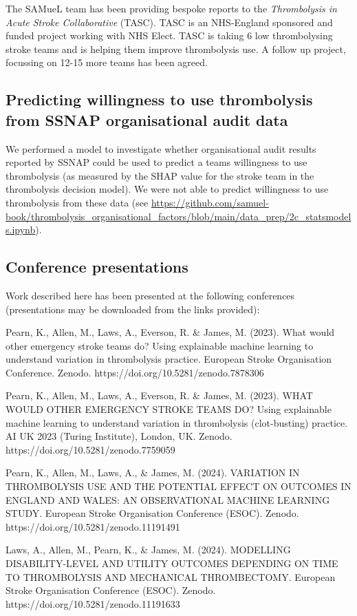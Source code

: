 The SAMueL team has been providing bespoke reports to the \textit{Thrombolysis in Acute Stroke Collaborative} (TASC). TASC is an NHS-England sponsored and funded project working with NHS Elect. TASC is taking 6 low thrombolysing stroke teams and is helping them improve thrombolysis use. A follow up project, focussing on 12-15 more teams has been agreed.

\subsection{Predicting willingness to use thrombolysis from SSNAP organisational audit data}

We performed a model to investigate whether organisational audit results reported by SSNAP could be used to predict a teams willingness to use thrombolysis (as measured by the SHAP value for the stroke team in the thrombolysis decision model). We were not able to predict willingness to use thrombolysis from these data (see \url{https://github.com/samuel-book/thrombolysis_organisational_factors/blob/main/data_prep/2c_statsmodels.ipynb}).

\subsection{Conference presentations}

Work described here has been presented at the following conferences (presentations may be downloaded from the links provided):

Pearn, K., Allen, M., Laws, A., Everson, R. & James, M. (2023). What would other emergency stroke teams do? Using explainable machine learning to understand variation in thrombolysis practice. European Stroke Organisation Conference. Zenodo. https://doi.org/10.5281/zenodo.7878306

Pearn, K., Allen, M., Laws, A., Everson, R. & James, M. (2023). WHAT WOULD OTHER EMERGENCY STROKE TEAMS DO? Using explainable machine learning to understand variation in thrombolysis (clot-busting) practice. AI UK 2023 (Turing Institute), London, UK. Zenodo. https://doi.org/10.5281/zenodo.7759059

Pearn, K., Allen, M., Laws, A., & James, M. (2024). VARIATION IN THROMBOLYSIS USE AND THE POTENTIAL EFFECT ON OUTCOMES IN ENGLAND AND WALES: AN OBSERVATIONAL MACHINE LEARNING STUDY. European Stroke Organisation Conference (ESOC). Zenodo. https://doi.org/10.5281/zenodo.11191491

Laws, A., Allen, M., Pearn, K., & James, M. (2024). MODELLING DISABILITY-LEVEL AND UTILITY OUTCOMES DEPENDING ON TIME TO THROMBOLYSIS AND MECHANICAL THROMBECTOMY. European Stroke Organisation Conference (ESOC). Zenodo. https://doi.org/10.5281/zenodo.11191633

